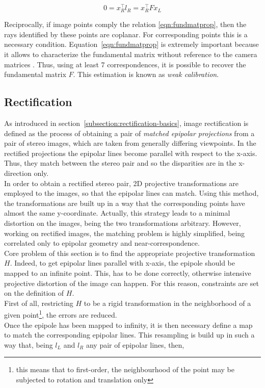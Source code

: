 \begin{equation}
	0 = x_R^\top l_R = x_R^\top F x_L
\end{equation}

Reciprocally, if image points comply the relation \ref{eqn:fundmatprop}, then the rays identified by these points are coplanar. 
For corresponding points this is a necessary condition.
Equation~\ref{eqn:fundmatprop} is extremely important because it allows to characterize the fundamental matrix without reference to the camera matrices \cite{hartley2004multiple}.
Thus, using at least 7 correspondences, it is possible to recover the fundamental matrix $F$. 
This estimation is known as \textit{weak calibration}.

\subsection{Rectification}
\label{subsection:rectification}

As introduced in section~\ref{subsection:rectification-basics}, image rectification is defined as the process of obtaining a pair of \textit{matched epipolar projections} from a pair of stereo images, which are taken from generally differing viewpoints.
In the rectified projections the epipolar lines become parallel with respect to the x-axis. 
Thus, they match between the stereo pair and so the disparities are in the x-direction only.\\
In order to obtain a rectified stereo pair, 2D projective transformations are employed to the images, so that the epipolar lines can match.
Using this method, the transformations are built up in a way that the corresponding points have almost the same y-coordinate.
Actually, this strategy leads to a minimal distortion on the images, being the two transformations arbitrary. 
However, working on rectified images, the matching problem is highly simplified, being correlated only to epipolar geometry and near-correspondence. \\
Core problem of this section is to find the appropriate projective transformation $H$. 
Indeed, to get epipolar lines parallel with x-axis, the epipole should be mapped to an infinite point. 
This, has to be done correctly, otherwise intensive projective distortion of the image can happen.
For this reason, constraints are set on the definition of $H$.\\
First of all, restricting $H$ to be a rigid transformation in the neighborhood of a given point\footnote{this means that to first-order, the neighbourhood of the point may be subjected to rotation and translation only}, the errors are reduced.\\
Once the epipole has been mapped to infinity, it is then necessary define a map to match the corresponding epipolar lines.
This resampling is build up in such a way that, being $l_L$ and $l_R$ any pair of epipolar lines, then,

